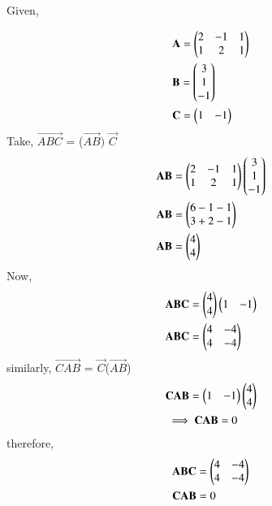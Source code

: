 Given,

\begin{align}
&\mathbf{A} = \begin{pmatrix}2&-1&1\\1&2&1\end{pmatrix}\\
& \mathbf{B}= \begin{pmatrix}3\\1\\-1\end{pmatrix}\\
& \mathbf{C}=\begin{pmatrix}1&-1\end{pmatrix}
\end{align}
Take,
 $\vec{ABC}$ = ($\vec{AB})$ $\vec{C}$
 \begin{align}
&\mathbf{AB}= \begin{pmatrix}2&-1&1\\1&2&1\end{pmatrix}\begin{pmatrix}3\\1\\-1\end{pmatrix}\\
&\mathbf{AB}=\begin{pmatrix}6-1-1\\3+2-1\end{pmatrix}\\
&\mathbf{AB}=\begin{pmatrix}4\\4\end{pmatrix}
 \end{align}
Now,
 \begin{align}
&\mathbf{ABC}= \begin{pmatrix}4\\4\end{pmatrix} \begin{pmatrix}1&-1\end{pmatrix}\\
&\mathbf{ABC}= \begin{pmatrix}4 & -4\\4 & -4\end{pmatrix}
 \end{align}
 similarly,
 $\vec{CAB}$ = $\vec{C}$($\vec{AB}$) 
\begin{align}
&\mathbf{CAB} = \begin{pmatrix}1&-1\end{pmatrix} \begin{pmatrix}4\\4\end{pmatrix}\\
&\implies \mathbf{CAB} = 0
 \end{align}
  therefore,
\begin{align}
& \mathbf{ABC}=\begin{pmatrix}4&-4\\4&-4\end{pmatrix}\\
&  \mathbf{CAB}=0
\end{align}
